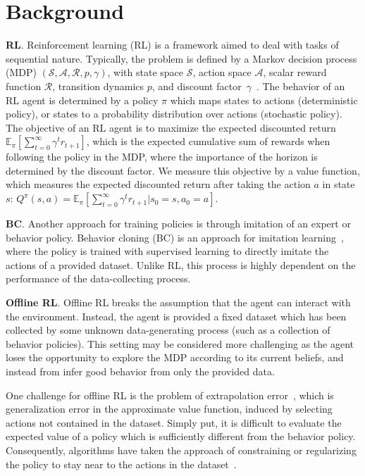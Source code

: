 \documentclass{article}
\newcommand{\y}{\gamma}
\newcommand{\E}{\mathbb{E}}
\newcommand{\lb}{\left [}
\newcommand{\rb}{\right ]}
\begin{document}
\section{Background}

\textbf{RL}. Reinforcement learning (RL) is a framework aimed to deal with tasks of sequential nature. Typically, the problem is defined by a Markov decision process (MDP) $(\mathcal{S}, \mathcal{A}, \mathcal{R}, p, \y)$, with state space $\mathcal{S}$, action space $\mathcal{A}$, scalar reward function $\mathcal{R}$, transition dynamics $p$, and discount factor~$\y$~\citep{sutton1998reinforcement}. The behavior of an RL agent is determined by a policy $\pi$ which maps states to actions (deterministic policy), or states to a probability distribution over actions (stochastic policy). The objective of an RL agent is to maximize the expected discounted return $\E_\pi[\sum_{t=0}^\infty \y^t r_{t+1}]$, which is the expected cumulative sum of rewards when following the policy in the MDP, where the importance of the horizon is determined by the discount factor. We measure this objective by a value function, which measures the expected discounted return after taking the action $a$ in state~$s$: $Q^\pi(s,a) = \E_\pi \lb \sum_{t=0}^\infty \y^t r_{t+1} | s_0 = s, a_0 = a \rb$. 

\textbf{BC}. Another approach for training policies is through imitation of an expert or behavior policy. Behavior cloning (BC) is an approach for imitation learning~\citep{pomerleau1991efficient}, where the policy is trained with supervised learning to directly imitate the actions of a provided dataset. Unlike RL, this process is highly dependent on the performance of the data-collecting process.  



\textbf{Offline RL}. Offline RL breaks the assumption that the agent can interact with the environment. Instead, the agent is provided a fixed dataset which has been collected by some unknown data-generating process (such as a collection of behavior policies). This setting may be considered more challenging as the agent loses the opportunity to explore the MDP according to its current beliefs, and instead from infer good behavior from only the provided data. 

One challenge for offline RL is the problem of extrapolation error~\citep{fujimoto2018off}, which is generalization error in the approximate value function, induced by selecting actions not contained in the dataset. Simply put, it is difficult to evaluate the expected value of a policy which is sufficiently different from the behavior policy. Consequently, algorithms have taken the approach of constraining or regularizing the policy to stay near to the actions in the dataset~\citep{levine2020offline}. 
\end{document}
